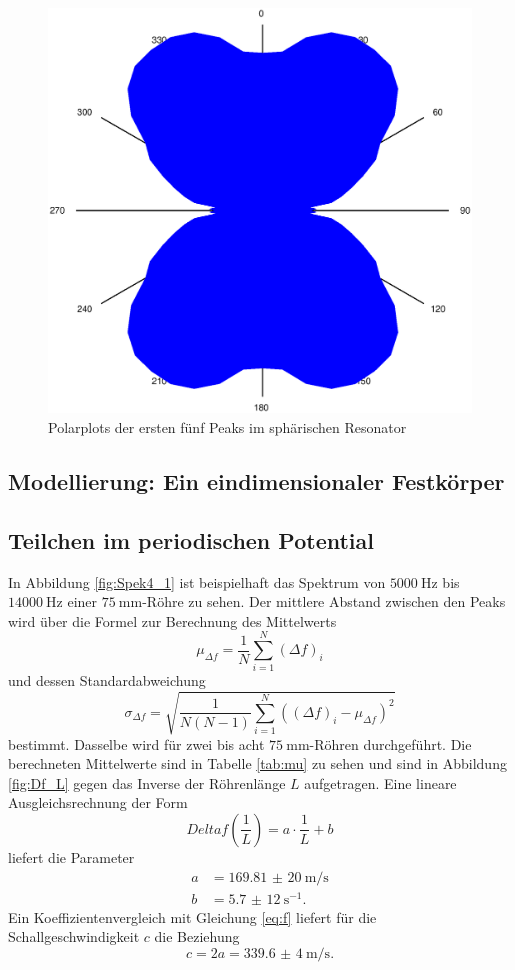 \begin{figure}
\begin{minipage}{0.45\textwidth}
\end{minipage}
\includegraphics[width=\linewidth*9/20,keepaspectratio]{FP-V23data/2.3_6571.732Hz.eps}
\caption{Polarplots der ersten fünf Peaks im sphärischen Resonator}
\label{fig:polar}
\end{figure}

\subsection{Modellierung: Ein eindimensionaler Festkörper}
\subsection{Teilchen im periodischen Potential}

In Abbildung \ref{fig:Spek4_1} ist beispielhaft das Spektrum von  $\SI{5000}{\hertz}$ bis $\SI{14000}{\hertz}$ einer $\SI{75}{\milli\meter}$-Röhre zu sehen.
Der mittlere Abstand zwischen den Peaks wird über die Formel zur Berechnung des Mittelwerts
\[
\mu_{\Delta f} = \frac{1}{N}\sum_{i=1}^{N}(\Delta f)_i
\]
und dessen Standardabweichung
\[
\sigma_{\Delta f} = \sqrt{\frac{1}{N(N-1)}\sum_{i=1}^{N}((\Delta f)_i-\mu_{\Delta f})^2}
\]
bestimmt. Dasselbe wird für zwei bis acht $\SI{75}{\milli\meter}$-Röhren durchgeführt. Die berechneten Mittelwerte sind in Tabelle
\ref{tab:mu} zu sehen und sind in Abbildung \ref{fig:Df_L} gegen das Inverse der Röhrenlänge $L$ aufgetragen. Eine lineare Ausgleichsrechnung der Form 
\[
Delta f\left(\frac{1}{L}\right)= a\cdot\frac{1}{L}+b
\]
liefert die Parameter
\begin{align*}
a&=\SI{169,81(20)}{\meter\per\second}\\
b&=\SI{5,7(12)}{\second^{-1}}\text{.}
\end{align*}
Ein Koeffizientenvergleich mit Gleichung \eqref{eq:f} liefert für die Schallgeschwindigkeit $c$ die Beziehung
\[
c=2 a=\SI{339,6(4)}{\meter\per\second}\text{.}
\]

